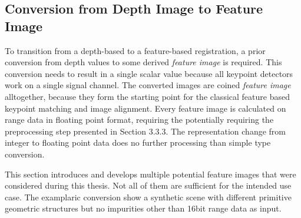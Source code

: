 \subsection{Conversion from Depth Image to Feature Image}\label{sec:feature_images}

To transition from a depth-based to a feature-based registration, a prior conversion from depth values to some derived \emph{feature image} is required.
This conversion needs to result in a single scalar value because all keypoint detectors work on a single signal channel.
The converted images are coined \emph{feature image} alltogether, because they form the starting point for the classical feature based keypoint matching and image alignment.
Every feature image is calculated on range data in floating point format, requiring the potentially requiring the preprocessing step presented in Section 3.3.3.
The representation change from integer to floating point data does no further processing than simple type conversion.

This section introduces and develops multiple potential feature images that were considered during this thesis.
Not all of them are sufficient for the intended use case.
The examplaric conversion show a synthetic scene with different primitive geometric structures but no impurities other than 16bit range data as input.






